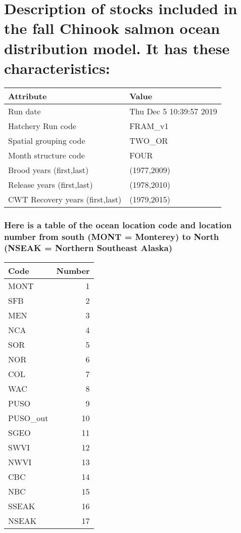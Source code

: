 \documentclass[]{article}
\title{}
\author{}
\date{}
\begin{document}
\hypertarget{description-of-stocks-included-in-the-fall-chinook-salmon-ocean-distribution-model.-it-has-these-characteristics}{%
\section{Description of stocks included in the fall Chinook salmon ocean
distribution model. It has these
characteristics:}\label{description-of-stocks-included-in-the-fall-chinook-salmon-ocean-distribution-model.-it-has-these-characteristics}}

\begin{longtable}[]{@{}ll@{}}
\toprule
Attribute & Value\tabularnewline
\midrule
\endhead
Run date & Thu Dec 5 10:39:57 2019\tabularnewline
Hatchery Run code & FRAM\_v1\tabularnewline
Spatial grouping code & TWO\_OR\tabularnewline
Month structure code & FOUR\tabularnewline
Brood years (first,last) & (1977,2009)\tabularnewline
Release years (first,last) & (1978,2010)\tabularnewline
CWT Recovery years (first,last) & (1979,2015)\tabularnewline
\bottomrule
\end{longtable}

\hypertarget{here-is-a-table-of-the-ocean-location-code-and-location-number-from-south-mont-monterey-to-north-nseak-northern-southeast-alaska}{%
\subsubsection{Here is a table of the ocean location code and location
number from south (MONT = Monterey) to North (NSEAK = Northern Southeast
Alaska)}\label{here-is-a-table-of-the-ocean-location-code-and-location-number-from-south-mont-monterey-to-north-nseak-northern-southeast-alaska}}

\begin{longtable}[]{@{}lr@{}}
\toprule
Code & Number\tabularnewline
\midrule
\endhead
MONT & 1\tabularnewline
SFB & 2\tabularnewline
MEN & 3\tabularnewline
NCA & 4\tabularnewline
SOR & 5\tabularnewline
NOR & 6\tabularnewline
COL & 7\tabularnewline
WAC & 8\tabularnewline
PUSO & 9\tabularnewline
PUSO\_out & 10\tabularnewline
SGEO & 11\tabularnewline
SWVI & 12\tabularnewline
NWVI & 13\tabularnewline
CBC & 14\tabularnewline
NBC & 15\tabularnewline
SSEAK & 16\tabularnewline
NSEAK & 17\tabularnewline
\bottomrule
\end{longtable}

\newpage
\end{document}
